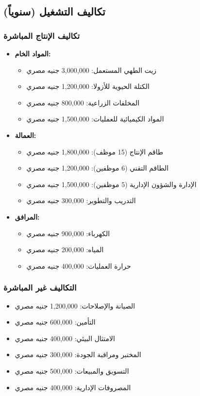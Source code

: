 \subsection{تكاليف التشغيل (سنوياً)}

\subsubsection{تكاليف الإنتاج المباشرة}
\begin{itemize}
    \item \textbf{المواد الخام:}
    \begin{itemize}
        \item زيت الطهي المستعمل: 3,000,000 جنيه مصري
        \item الكتلة الحيوية للأزولا: 1,200,000 جنيه مصري
        \item المخلفات الزراعية: 800,000 جنيه مصري
        \item المواد الكيميائية للعمليات: 1,500,000 جنيه مصري
    \end{itemize}
    
    \item \textbf{العمالة:}
    \begin{itemize}
        \item طاقم الإنتاج (15 موظف): 1,800,000 جنيه مصري
        \item الطاقم التقني (6 موظفين): 1,200,000 جنيه مصري
        \item الإدارة والشؤون الإدارية (5 موظفين): 1,500,000 جنيه مصري
        \item التدريب والتطوير: 300,000 جنيه مصري
    \end{itemize}
    
    \item \textbf{المرافق:}
    \begin{itemize}
        \item الكهرباء: 900,000 جنيه مصري
        \item المياه: 200,000 جنيه مصري
        \item حرارة العمليات: 400,000 جنيه مصري
    \end{itemize}
\end{itemize}

\subsubsection{التكاليف غير المباشرة}
\begin{itemize}
    \item الصيانة والإصلاحات: 1,200,000 جنيه مصري
    \item التأمين: 600,000 جنيه مصري
    \item الامتثال البيئي: 400,000 جنيه مصري
    \item المختبر ومراقبة الجودة: 300,000 جنيه مصري
    \item التسويق والمبيعات: 500,000 جنيه مصري
    \item المصروفات الإدارية: 400,000 جنيه مصري
\end{itemize}

